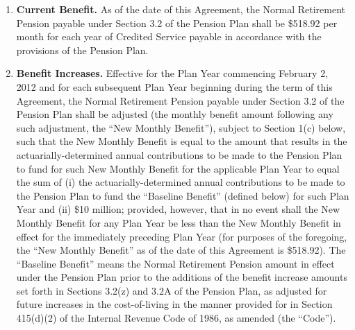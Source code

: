 \documentclass[
]{book}
\providecommand{\tightlist}{%
  \setlength{\itemsep}{0pt}\setlength{\parskip}{0pt}}
\begin{document}
\begin{enumerate}
\def\labelenumi{(\alph{enumi})}
\tightlist
\item
  \textbf{Current Benefit.} As of the date of this Agreement, the Normal Retirement Pension payable under Section 3.2 of the Pension Plan shall be \$518.92 per month for each year of Credited Service payable in accordance with the provisions of the Pension Plan.
\item
  \textbf{Benefit Increases.} Effective for the Plan Year commencing February 2, 2012 and for each subsequent Plan Year beginning during the term of this Agreement, the Normal Retirement Pension payable under Section 3.2 of the Pension Plan shall be adjusted (the monthly benefit amount following any such adjustment, the ``New Monthly Benefit''), subject to Section 1(c) below, such that the New Monthly Benefit is equal to the amount that results in the actuarially-determined annual contributions to be made to the Pension Plan to fund for such New Monthly Benefit for the applicable Plan Year to equal the sum of (i) the actuarially-determined annual contributions to be made to the Pension Plan to fund the ``Baseline Benefit'' (defined below) for such Plan Year and (ii) \$10 million; provided, however, that in no event shall the New Monthly Benefit for any Plan Year be less than the New Monthly Benefit in effect for the immediately preceding Plan Year (for purposes of the foregoing, the ``New Monthly Benefit'' as of the date of this Agreement is \$518.92). The ``Baseline Benefit'' means the Normal Retirement Pension amount in effect under the Pension Plan prior to the additions of the benefit increase amounts set forth in Sections 3.2(z) and 3.2A of the Pension Plan, as adjusted for future increases in the cost-of-living in the manner provided for in Section 415(d)(2) of the Internal Revenue Code of 1986, as amended (the ``Code'').


\end{enumerate}
\end{document}
